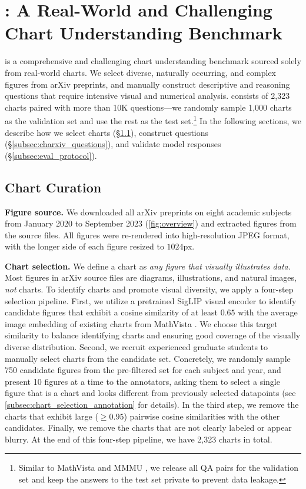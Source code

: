 \section{\texorpdfstring{}{CharXiv}: A Real-World and Challenging Chart Understanding Benchmark}
\label{sec:charxiv_overview}
\ours{} is a comprehensive and challenging chart understanding benchmark sourced solely from real-world charts. 
We select diverse, naturally occurring, and complex figures from arXiv preprints, and manually construct descriptive and reasoning questions that require intensive visual and numerical analysis. 
\ours{} consists of 2,323 charts paired with more than 10K questions---we randomly sample 1,000 charts as the validation set and use the rest as the test set.\footnote{Similar to MathVista \cite{lu2024mathvista} and MMMU \cite{yue2023mmmu}, we release all QA pairs for the validation set and keep the answers to the test set private to prevent data leakage.} In the following sections, we describe how we select charts (\S\ref{subsec:charxiv_chart}), construct questions (\S\ref{subsec:charxiv_questions}), and validate model responses (\S\ref{subsec:eval_protocol}).

\subsection{Chart Curation}
\label{subsec:charxiv_chart}
\textbf{Figure source. }We downloaded all arXiv preprints on eight academic subjects from January 2020 to September 2023 (\cref{fig:overview}) and extracted figures from the source files. 
All figures were re-rendered into high-resolution JPEG format, with the longer side of each figure resized to $1024$px.

\textbf{Chart selection. }
We define a chart as \emph{any figure that visually illustrates data}. 
Most figures in arXiv source files are diagrams, illustrations, and natural images, \emph{not} charts. 
To identify charts and promote visual diversity, we apply a four-step selection pipeline. 
First, we utilize a pretrained SigLIP visual encoder \cite{zhai2023sigmoid} to identify candidate figures that exhibit a cosine similarity of at least $0.65$ with the average image embedding of existing charts from MathVista \cite{kafle2018dvqa, kahou2017figureqa, masry2022chartqa, lu2024mathvista}. 
We choose this target similarity to balance identifying charts and ensuring good coverage of the visually diverse distribution. 
Second, we recruit experienced graduate students to manually select charts from the candidate set.
Concretely, we randomly sample 750 candidate figures from the pre-filtered set for each subject and year, and present 10 figures at a time to the annotators, asking them to select a single figure that is a chart and looks different from previously selected datapoints (see \cref{subsec:chart_selection_annotation} for details). 
In the third step, we remove the charts that exhibit large ($\geq 0.95$) pairwise cosine similarities with the other candidates. 
Finally, we remove the charts that are not clearly labeled or appear blurry. 
At the end of this four-step pipeline, we have 2,323 charts in total. 

